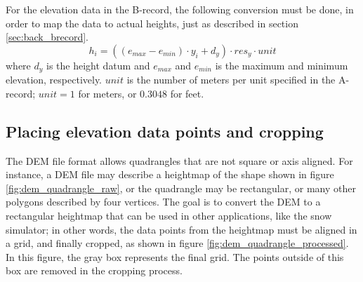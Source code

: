 For the elevation data in the B-record, the following conversion must be done, in order to map the data to actual heights, just as described in section \ref{sec:back_brecord}.
$$
h_i = ((e_{max}-e_{min})\cdot y_i+ d_y)\cdot res_y \cdot unit
$$
where $d_y$ is the height datum and $e_{max}$ and $e_{min}$ is the maximum and minimum elevation, respectively. $unit$ is the number of meters per unit specified in the A-record; $unit=1$ for meters, or $0.3048$ for feet.

\subsection{Placing elevation data points and cropping}
The DEM file format allows quadrangles that are not square or axis aligned. For instance, a DEM file may describe a heightmap of the shape shown in figure \ref{fig:dem_quadrangle_raw}, or the quadrangle may be rectangular, or many other polygons described by four vertices. The goal is to convert the DEM to a rectangular heightmap that can be used in other applications, like the snow simulator; in other words, the data points from the heightmap must be aligned in a grid, and finally cropped, as shown in figure \ref{fig:dem_quadrangle_processed}. In this figure, the gray box represents the final grid. The points outside of this box are removed in the cropping process.


